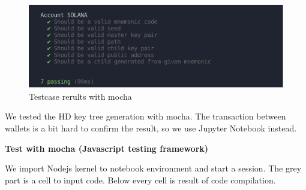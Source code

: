 \begin{figure}[ht!]
    \centering
    \includegraphics[width=1\textwidth]{images/test_mocha.png}
    \caption[Testcase rerults with mocha]{Testcase rerults with mocha}
    \label{fig:testmocha}
\end{figure}

We tested the HD key tree generation with mocha. The transaction between wallets is a bit hard to confirm the result, so we use Jupyter Notebook instead.

\bigskip
{\textbf{Test with mocha (Javascript testing framework)}}
\bigskip

We import Nodejs kernel to notebook environment and start a session. The grey part is a cell to input code. Below every cell is result of code compilation.


